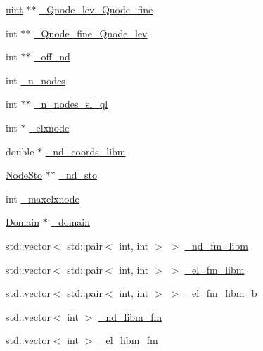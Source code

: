 \begin{DoxyCompactItemize}
\item 
\mbox{\hyperlink{_typedefs_8hpp_a91ad9478d81a7aaf2593e8d9c3d06a14}{uint}} $\ast$$\ast$ \mbox{\hyperlink{classfemus_1_1_multi_level_mesh_two_a920204d0b6e8914d8b16e84e5f5b3b03}{\+\_\+\+Qnode\+\_\+lev\+\_\+\+Qnode\+\_\+fine}}
\item 
int $\ast$$\ast$ \mbox{\hyperlink{classfemus_1_1_multi_level_mesh_two_accd4caec1f81d3dfad0f1c69dd87b467}{\+\_\+\+Qnode\+\_\+fine\+\_\+\+Qnode\+\_\+lev}}
\item 
int $\ast$$\ast$ \mbox{\hyperlink{classfemus_1_1_multi_level_mesh_two_ad212108f2e50d25b0ccdb3202a1fa130}{\+\_\+off\+\_\+nd}}
\item 
int \mbox{\hyperlink{classfemus_1_1_multi_level_mesh_two_a2befae1f6286793dd66b614987eff74c}{\+\_\+n\+\_\+nodes}}
\item 
int $\ast$$\ast$ \mbox{\hyperlink{classfemus_1_1_multi_level_mesh_two_a2aa71c7d2a8aaf40ef6b28c0606cf7fe}{\+\_\+n\+\_\+nodes\+\_\+sl\+\_\+ql}}
\item 
int $\ast$ \mbox{\hyperlink{classfemus_1_1_multi_level_mesh_two_a1a12e7b8a567e73ca83cec9218b4aa41}{\+\_\+elxnode}}
\item 
double $\ast$ \mbox{\hyperlink{classfemus_1_1_multi_level_mesh_two_a846b0a2baf5039c237d68920d7ee1f09}{\+\_\+nd\+\_\+coords\+\_\+libm}}
\item 
\mbox{\hyperlink{classfemus_1_1_node_sto}{Node\+Sto}} $\ast$$\ast$ \mbox{\hyperlink{classfemus_1_1_multi_level_mesh_two_a4324ce4d34f7d71cd37e19c271a416fc}{\+\_\+nd\+\_\+sto}}
\item 
int \mbox{\hyperlink{classfemus_1_1_multi_level_mesh_two_a36e0eff2f50cb30f84ce331345108988}{\+\_\+maxelxnode}}
\item 
\mbox{\hyperlink{classfemus_1_1_domain}{Domain}} $\ast$ \mbox{\hyperlink{classfemus_1_1_multi_level_mesh_two_aeadabac66a6ee1c7fe8ec9b53c47a01b}{\+\_\+domain}}
\item 
std\+::vector$<$ std\+::pair$<$ int, int $>$ $>$ \mbox{\hyperlink{classfemus_1_1_multi_level_mesh_two_aca0f0af0223841f4cf9b306fdb2e3462}{\+\_\+nd\+\_\+fm\+\_\+libm}}
\item 
std\+::vector$<$ std\+::pair$<$ int, int $>$ $>$ \mbox{\hyperlink{classfemus_1_1_multi_level_mesh_two_a3078cd94966a22672df6b24d24fdcd60}{\+\_\+el\+\_\+fm\+\_\+libm}}
\item 
std\+::vector$<$ std\+::pair$<$ int, int $>$ $>$ \mbox{\hyperlink{classfemus_1_1_multi_level_mesh_two_a096557dfb03c8fa0173c29beaed36fee}{\+\_\+el\+\_\+fm\+\_\+libm\+\_\+b}}
\item 
std\+::vector$<$ int $>$ \mbox{\hyperlink{classfemus_1_1_multi_level_mesh_two_a5c4d7084bf63a5fd8b3ee38ec667dd79}{\+\_\+nd\+\_\+libm\+\_\+fm}}
\item 
std\+::vector$<$ int $>$ \mbox{\hyperlink{classfemus_1_1_multi_level_mesh_two_a6abbf958a300ffd816c2bc7b42652320}{\+\_\+el\+\_\+libm\+\_\+fm}}
\end{DoxyCompactItemize}

